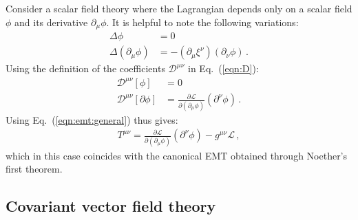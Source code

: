 \documentclass[prd,preprint,
  showpacs,showkeys,lengthcheck,
  nofootinbib,tightenlines,onecolumn,notitlepage,
  preprintnumbers,superscriptaddress]{revtex4-1}
\newcommand{\Lag}{\ensuremath{\mathscr{L}}}
\newcommand{\dx}{\ensuremath{\xi}}
\begin{document}
Consider a scalar field theory where the Lagrangian depends only
on a scalar field $\phi$ and its derivative $\partial_\mu\phi$.
It is helpful to note the following variations:
\begin{subequations}
  \begin{align}
    \Delta \phi
    &=
    0
    \\
    \Delta (\partial_\mu \phi)
    &=
    -
    (\partial_\mu \dx^\nu)
    (\partial_\nu \phi)
    \,.
  \end{align}
\end{subequations}
Using the definition of the coefficients $\mathscr{D}^{\mu\nu}$
in Eq.~(\ref{eqn:D}):
\begin{subequations}
  \label{eqn:D:scalar}
  \begin{align}
    \mathscr{D}^{\mu\nu}[\phi]
    &=
    0
    \\
    \mathscr{D}^{\mu\nu}[\partial\phi]
    &=
    \frac{\partial\Lag}{\partial(\partial_\mu\phi)}
    (\partial^\nu \phi)
    \,.
  \end{align}
\end{subequations}
Using Eq.~(\ref{eqn:emt:general}) thus gives:
\begin{align}
  T^{\mu\nu}
  =
  \frac{\partial\Lag}{\partial(\partial_\mu\phi)}
  (\partial^\nu \phi)
  -
  g^{\mu\nu}
  \Lag
  \,,
\end{align}
which in this case coincides with the canonical EMT obtained
through Noether's first theorem.



\subsection{Covariant vector field theory}
\end{document}
